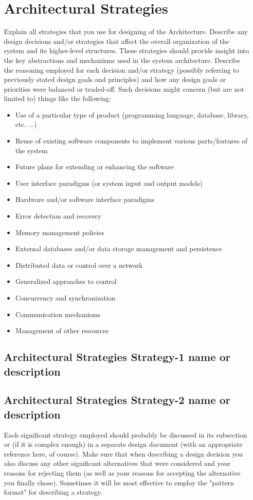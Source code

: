\documentclass{FastFyp}
\begin{document}
\section{Architectural Strategies}
Explain all strategies that you use for designing of the Architecture. Describe any design decisions and/or strategies that affect the overall organization of the system and its higher-level structures. These strategies should provide insight into the key abstractions and mechanisms used in the system architecture. Describe the reasoning employed for each decision and/or strategy (possibly referring to previously stated design goals and principles) and how any design goals or priorities were balanced or traded-off. Such decisions might concern (but are not limited to) things like the following:
\begin{itemize}
    \item Use of a particular type of product (programming language, database, library, etc. ...) 
  \item Reuse of existing software components to implement various parts/features of the system 
  \item Future plans for extending or enhancing the software 
  \item User interface paradigms (or system input and output models) 
  \item Hardware and/or software interface paradigms 
  \item Error detection and recovery 
  \item Memory management policies 
  \item External databases and/or data storage management and persistence 
  \item Distributed data or control over a network 
  \item Generalized approaches to control 
  \item Concurrency and synchronization 
  \item Communication mechanisms 
  \item Management of other resources
\end{itemize}
\subsection{Architectural Strategies Strategy-1 name or description} 
\subsection{Architectural Strategies Strategy-2 name or description} 
Each significant strategy employed should probably be discussed in its subsection or (if it is complex enough) in a separate design document (with an appropriate reference here, of course). Make sure that when describing a design decision you also discuss any other significant alternatives that were considered and your reasons for rejecting them (as well as your reasons for accepting the alternative you finally chose). Sometimes it will be most effective to employ the "pattern format" for describing a strategy.
\end{document}
